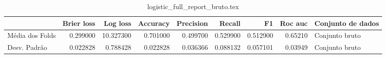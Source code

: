 \begin{table}
\centering
\caption{logistic_full_report_bruto.tex}
\label{logistic_full_report_bruto.tex}
\begin{tabular}{lrrrrrrrl}
\toprule
{}              &  Brier  loss &   Log loss &  Accuracy  &  Precision  &   Recall  &       F1  &  Roc auc  & Conjunto de dados \\
\midrule
Média dos Folds &     0.299000 &  10.327300 &   0.701000 &    0.499700 &  0.529900 &  0.512900 &   0.65210 &    Conjunto bruto \\
Desv. Padrão    &     0.022828 &   0.788428 &   0.022828 &    0.036366 &  0.088132 &  0.057101 &   0.03949 &    Conjunto bruto \\
\bottomrule
\end{tabular}
\end{table}
